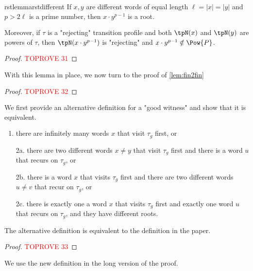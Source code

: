 \documentclass[a4paper,USenglish,cleveref,autoref,thm-restate]{lipics-v2021}
\begin{document}
{\begin{restatable}{rstlemma}{rstdifferent}
    \label{lem:different}
    If $x,y$ are different words of equal length $\ell=|x|=|y|$ and $p>2\ell$ is a prime number, then $x \cdot y^{p-1}$ is a root.

    Moreover, if $\tau$ is a "rejecting" transition profile and both $\tpN(x)$ and $\tpN(y)$ are powers of $\tau$, then $\tpN(x\cdot y^{p-1})$ is "rejecting" and $x\cdot y^{p-1} \notin \Pow{P}$.
\end{restatable}



\begin{proof}\textcolor{red}{TOPROVE 31}\end{proof}

With this lemma in place, we now turn to the proof of \cref{lem:fin2fin}

\begin{proof}\textcolor{red}{TOPROVE 32}\end{proof}



\rstInfiniteGoodness*

We first provide an alternative definition for a "good witness" and show that it is equivalent.

\begin{enumerate}
    \item there are infinitely many words $x$ that visit $\tau_g$ first, or
    \item[2a.] there are two different
          words $x\neq y$ that visit $\tau_g$ first and there is a word $u$ that recurs on $\tau_g$, or
    \item[2b.] there is a word $x$ that visits $\tau_g$ first and there are two different
          words $u \neq v$ that recur on $\tau_g$, or
    \item[2c.] there is exactly one a word $x$ that visits $\tau_g$ first and exactly one word $u$ that recurs on $\tau_g$, and they have different roots.
\end{enumerate}

\begin{lemma}\label{lem:sameGoodness}
    The alternative definition is equivalent to the definition in the paper.
\end{lemma}

\begin{proof}\textcolor{red}{TOPROVE 33}\end{proof}

We use the new definition in the long version of the proof.

}
\end{document}

